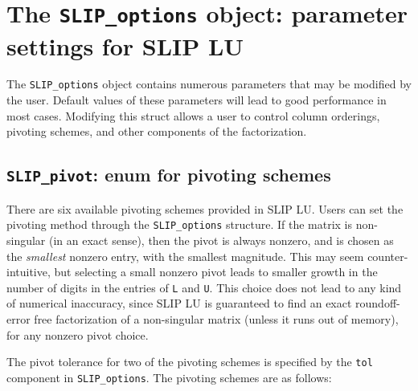 \documentclass[12pt]{article}
\theoremstyle{definition}
\begin{document}
\cprotect\section{The \verb|SLIP_options| object:
parameter settings for SLIP LU} \label{ss:SLIP_options}

The \verb|SLIP_options| object contains numerous parameters that may be
modified by the user. Default values of these parameters will lead to good
performance in most cases.  Modifying this struct allows a user to
control column orderings, pivoting schemes, and other components of the
factorization.

\cprotect\subsection{\verb|SLIP_pivot|: enum for pivoting schemes}
\label{ss:SLIP_pivot}

There are six available pivoting schemes provided in SLIP LU.  Users can set
the pivoting method through the \verb|SLIP_options| structure.  If the matrix
is non-singular (in an exact sense), then the pivot is always nonzero, and is
chosen as the {\em smallest} nonzero entry, with the smallest magnitude.  This
may seem counter-intuitive, but selecting a small nonzero pivot leads to
smaller growth in the number of digits in the entries of \verb|L| and \verb|U|.
This choice does not lead to any kind of numerical inaccuracy, since SLIP LU is
guaranteed to find an exact roundoff-error free factorization of a non-singular
matrix (unless it runs out of memory), for any nonzero pivot choice.

The pivot tolerance for two of the pivoting schemes is specified by the
\verb|tol| component in \verb|SLIP_options|.  The pivoting schemes are as
follows:
\end{document}
